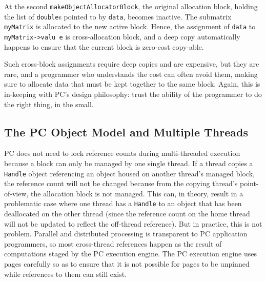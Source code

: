 At the second \texttt{makeObjectAllocatorBlock}, the original allocation block, holding the list of \texttt{double}s pointed to by \texttt{data}, becomes
inactive.  The submatrix \texttt{myMatrix} is allocated to the new active block.  
Hence, the assignment of \texttt{data} to \texttt{myMatrix->valu e} is cross-allocation block, and a deep copy automatically happens to ensure that
the current block is zero-cost copy-able.  

Such cross-block assignments require deep copies and are
expensive, but they are rare, and a programmer who understands the cost can often avoid them, making sure to allocate
data that must be kept together to the same block.
Again, this is in-keeping with PC's design philosophy: trust the ability of the programmer to do the right thing, in the small.

\subsection{The PC Object Model and Multiple Threads}

PC does not need to lock reference counts during multi-threaded execution
because 
a block can only be managed by one single thread.  
If a thread copies a \texttt{Handle} object referencing an object housed on another thread's managed block, 
the reference count will not be changed because from the copying thread's point-of-view, the allocation block is not managed.
This can, in theory, result in a problematic case where one thread has a \texttt{Handle} to an object that has been deallocated on the other thread (since
the reference count on the home thread will not be updated to reflect
the off-thread reference).  But in practice, this is not
problem.  Parallel and distributed processing is transparent to PC application
programmers, so most cross-thread references happen as the result of computations staged by the 
PC execution engine.  The PC execution engine uses pages carefully so as to ensure that 
it is not possible for pages to be unpinned while references to them can still exist.


